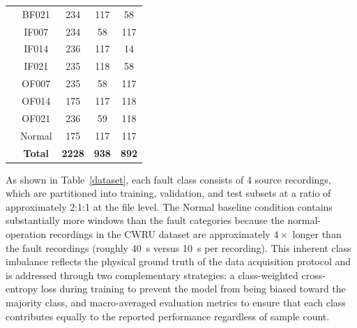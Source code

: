 \documentclass[journal]{IEEEtran}
\begin{document}
\begin{table}[!t]
\begin{tabular}{lcccc}
& BF021  & 234 & 117 & 58  \\
& IF007  & 234 & 58  & 117 \\
& IF014  & 236 & 117 & 14  \\
& IF021  & 235 & 118 & 58  \\
& OF007  & 235 & 58  & 117 \\
& OF014  & 175 & 117 & 118 \\
& OF021  & 236 & 59  & 118 \\
& Normal & 175 & 117 & 117 \\
& \textbf{Total} & \textbf{2228} & \textbf{938}  & \textbf{892}  \\
\bottomrule
\end{tabular}
\end{table}








As shown in Table~\ref{dataset}, each fault class consists of 4 source recordings, which are partitioned into training, validation, and test subsets at a ratio of approximately 2:1:1 at the file level. The Normal baseline condition contains substantially more windows than the fault categories because the normal-operation recordings in the CWRU dataset are approximately $4\times$ longer than the fault recordings (roughly 40~s versus 10~s per recording). This inherent class imbalance reflects the physical ground truth of the data acquisition protocol and is addressed through two complementary strategies: a class-weighted cross-entropy loss during training to prevent the model from being biased toward the majority class, and macro-averaged evaluation metrics to ensure that each class contributes equally to the reported performance regardless of sample count.
\end{document}
